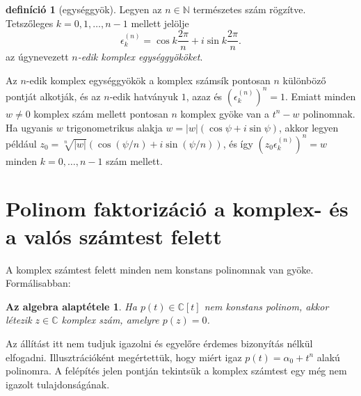 \documentclass[9pt, a4paper, showtrims]{memoir}
\theoremstyle{plain}
\newtheorem*{FA}{Az algebra alaptétele}
\theoremstyle{remark}
\theoremstyle{definition}
\newtheorem{definition}[proposition]{definíció}
\begin{document}
\begin{definition}[egységgyök]
    Legyen az $n\in\mathbb{N}$ természetes szám rögzítve.
    Tetszőleges $k=0,1,\dots,n-1$ mellett jelölje
    \[
        \epsilon_k^{(n)}=\cos k\frac{2\pi}{n}+i\sin k\frac{2\pi}{n}.
    \]
    az úgynevezett \emph{$n$-edik komplex egységgyököket}.
\end{definition}
Az $n$-edik komplex egységgyökök a komplex számsík pontosan $n$ különböző pontját alkotják,
és az $n$-edik hatványuk $1$, azaz 
és $(\epsilon_k^{(n)})^n=1$.
Emiatt minden $w\neq 0$ komplex szám mellett pontosan $n$ komplex gyöke van a $t^n-w$ polinomnak.
Ha ugyanis $w$ trigonometrikus alakja $w=|w|\left( \cos\psi+i\sin\psi \right)$,
akkor legyen például $z_0=\sqrt[n]{|w|}\left( \cos(\psi/n)+i\sin(\psi/n) \right)$,
és így $(z_0\epsilon_k^{(n)})^n=w$ minden $k=0,\dots,n-1$ szám mellett.
\section{Polinom faktorizáció a komplex- és a valós számtest felett}
A komplex számtest felett minden nem konstans polinomnak van gyöke.
Formálisabban:
\begin{FA}
    Ha $p\left( t \right)\in\mathbb{C}[t]$ nem konstans polinom,
    akkor létezik $z\in\mathbb{C}$ komplex szám, 
    amelyre $p\left( z \right)=0$.
\end{FA}
Az állítást itt nem tudjuk igazolni és egyelőre érdemes bizonyítás nélkül elfogadni.
Illusztrációként megértettük, hogy miért igaz $p\left( t \right)=\alpha_0+t^n$ alakú polinomra.
A felépítés jelen pontján tekintsük a komplex számtest egy még nem igazolt tulajdonságának.
\end{document}
